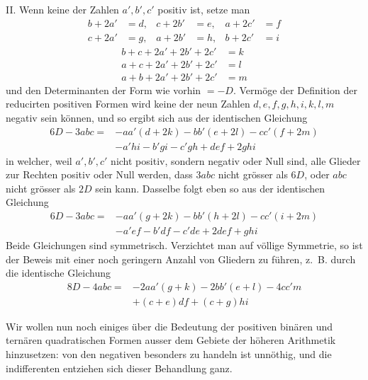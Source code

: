 II. Wenn keine der Zahlen $a',b',c'$ positiv ist, setze man
\[
\begin{aligned}
b+2a'&=d,&c+2b'&=e,&a+2c'&=f\\
c+2a'&=g,&a+2b'&=h,&b+2c'&=i
\end{aligned}
\]
\[
\begin{aligned}
b+c+2a'+2b'+2c'&=k\\
a+c+2a'+2b'+2c'&=l\\
a+b+2a'+2b'+2c'&=m
\end{aligned}
\]
und den Determinanten der Form wie vorhin $=-D$. Vermöge der Definition der reducirten positiven Formen wird keine der neun Zahlen $d,\allowbreak e,\allowbreak f,\allowbreak g,\allowbreak h,\allowbreak i,\allowbreak k,\allowbreak l,\allowbreak m$ negativ sein können, und so ergibt sich aus der identischen Gleichung
\[
\begin{aligned}
6D-3abc={}&-aa'(d+2k)-bb'(e+2l)-cc'(f+2m)\\
&-a'hi-b'gi-c'gh+def+2ghi
\end{aligned}
\]
in welcher, weil $a',b',c'$ nicht positiv, sondern negativ oder Null sind, alle Glieder zur Rechten positiv oder Null werden, dass $3abc$ nicht grösser als $6D$, oder $abc$ nicht grösser als $2D$ sein kann. Dasselbe folgt eben so aus der identischen Gleichung
\[
\begin{aligned}
6D-3abc={}&-aa'(g+2k)-bb'(h+2l)-cc'(i+2m)\\
&-a'ef-b'df-c'de+2def+ghi
\end{aligned}
\]
Beide Gleichungen sind symmetrisch. Verzichtet man auf völlige Symmetrie, so ist der Beweis mit einer noch geringern Anzahl von Gliedern zu führen, z.~B. durch die identische Gleichung
\[
\begin{aligned}
8D-4abc={}&-2aa'(g+k)-2bb'(e+l)-4cc'm\\
&+(c+e)df+(c+g)hi
\end{aligned}
\]

%
Wir wollen nun noch einiges über die Bedeutung der positiven binären und ternären quadratischen Formen ausser dem Gebiete der höheren Arithmetik hinzusetzen: von den negativen besonders zu handeln ist unnöthig, und die indifferenten entziehen sich dieser Behandlung ganz.

